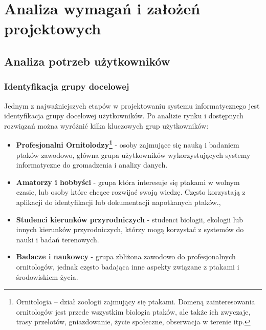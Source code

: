 %


\chapter{Analiza wymagań i założeń projektowych}
\label{rozdzial1}

\section{Analiza potrzeb użytkowników}

\subsection{Identyfikacja grupy docelowej}

Jednym z najważniejszych etapów w projektowaniu systemu informatycznego jest identyfikacja grupy docelowej użytkowników.
Po analizie rynku i dostępnych rozwiązań można wyróżnić kilka kluczowych grup użytkowników:
\begin{itemize}
	\item \textbf{Profesjonalni Ornitolodzy\footnote{Ornitologia – dział zoologii zajmujący się ptakami. Domeną zainteresowania ornitologów jest przede wszystkim biologia ptaków, ale także ich zwyczaje, trasy przelotów, gniazdowanie, życie społeczne, obserwacja w terenie itp.}} - osoby zajmujące się nauką i badaniem ptaków zawodowo, główna grupa użytkowników wykorzystujących systemy informatyczne do gromadzenia i analizy danych.
	\item \textbf{Amatorzy i hobbyści} - grupa która interesuje się ptakami w wolnym czasie, lub osoby które chcące rozwijać swoją wiedzę. Często korzystają z aplikacji do identyfikacji lub dokumentacji napotkanych ptaków.,
	\item \textbf{Studenci kierunków przyrodniczych} - studenci biologii, ekologii lub innych kierunków przyrodniczych, którzy mogą korzystać z systemów do nauki i badań terenowych.
	\item \textbf{Badacze i naukowcy} - grupa zbliżona zawodowo do profesjonalnych ornitologów, jednak często badająca inne aspekty związane z ptakami i środowiskiem życia.
\end{itemize}

